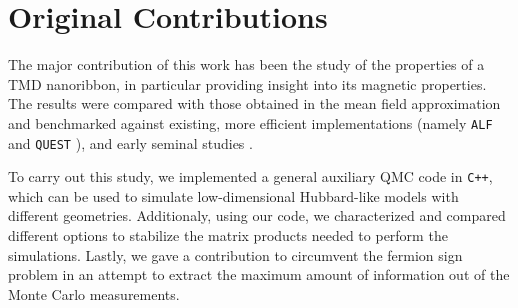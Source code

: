 \section{Original Contributions}
\label{sec:int_contributions}

The major contribution of this work has been the study of the properties of a \ac{TMD} nanoribbon, in particular providing insight into its magnetic properties.
The results were compared with those obtained in the mean field approximation and benchmarked against existing, more efficient implementations (namely \texttt{ALF} \cite{bercx_alf_2017} and \texttt{QUEST} \cite{noauthor_quest_2012}), and early seminal studies \cite{hirsch_discrete_1983,white_numerical_1989}.

To carry out this study, we implemented a general auxiliary \ac{QMC} code in \texttt{C++}, which can be used to simulate low-dimensional Hubbard-like models with different geometries.
Additionaly, using our code, we characterized and compared different options to stabilize the matrix products needed to perform the simulations.
Lastly, we gave a contribution to circumvent the fermion sign problem in an attempt to extract the maximum amount of information out of the Monte Carlo measurements.